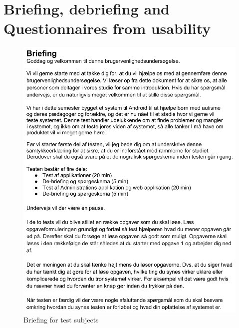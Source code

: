 \chapter{Briefing, debriefing and Questionnaires from usability}

\label{questionnaires}

\begin{figure}
	\centering
		\includegraphics{input/appendices/usability-briefing}
		\caption{Briefing for test subjects}
\end{figure}

